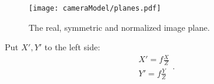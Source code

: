 \begin{figure}[!htp]
	\centering
	\texttt{[image: cameraModel/planes.pdf]}
	\caption{The real, symmetric and normalized image plane.}
	\label{fig:planes}
\end{figure}

Put $X', Y'$ to the left side:
\begin{equation}\label{eq:P2Pprime}
\begin{array}{l}
X' = f\frac{X}{Z}\\
Y' = f\frac{Y}{Z}
\end{array}.
\end{equation}
